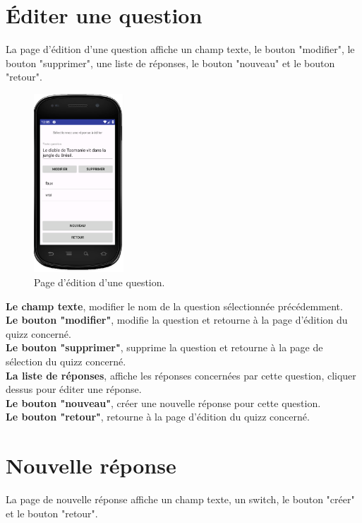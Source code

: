 \documentclass[a4paper]{report}
\begin{document}
\newpage
\section{Éditer une question}
La page d'édition d'une question affiche un champ texte, le bouton "modifier", le bouton "supprimer", une liste de réponses, le bouton "nouveau" et le bouton "retour".

\begin{figure}[h]
\centering
\includegraphics[width=0.3\textwidth]{editerQuestion.png}
\caption{\label{fig:Éditer une question}Page d'édition d'une question.}
\end{figure}

\textbf{Le champ texte}, modifier le nom de la question sélectionnée précédemment. \\
\textbf{Le bouton "modifier"}, modifie la question et retourne à la page d'édition du quizz concerné. \\
\textbf{Le bouton "supprimer"}, supprime la question et retourne à la page de sélection du quizz concerné. \\
\textbf{La liste de réponses}, affiche les réponses concernées par cette question, cliquer dessus pour éditer une réponse. \\
\textbf{Le bouton "nouveau"}, créer une nouvelle réponse pour cette question. \\
\textbf{Le bouton "retour"}, retourne à la page d'édition du quizz concerné. \\


\newpage
\section{Nouvelle réponse}
La page de nouvelle réponse affiche un champ texte, un switch, le bouton "créer" et le bouton "retour".
\end{document}
